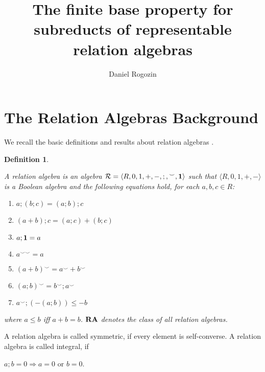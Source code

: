 \documentclass[a4paper]{article}
\author{Daniel Rogozin}
\date{}
\title{The finite base property for subreducts of representable relation algebras}
\theoremstyle{defin}
\newtheorem{defin}{Definition}
\theoremstyle{theorem}
\theoremstyle{prop}
\theoremstyle{lemma}
\theoremstyle{ex}
\theoremstyle{col}
\theoremstyle{claim}
\begin{document}
\maketitle

\section{The Relation Algebras Background}

We recall the basic definitions and results about relation algebras \cite{hirsch2002relation} \cite{maddux2006relation}.

\begin{defin}
  $ $

    A relation algebra is an algebra $\mathcal{R} = \langle R, 0, 1, +, -, ;, {}^{\smile}, {\bf 1 }\rangle$ such that $\langle R, 0, 1, +, - \rangle$ is a Boolean algebra and the following
    equations hold, for each $a, b, c \in R$:
    \begin{enumerate}
      \item $a ; (b ; c) = (a ; b) ; c$
      \item $(a + b) ; c = (a ; c) + (b ; c)$
      \item $a ; {\bf 1} = a$
      \item $a^{\smile \smile} = a$
      \item $(a + b)^{\smile} = a^{\smile} + b^{\smile}$
      \item $(a ; b)^{\smile} = b^{\smile} ; a^{\smile}$
      \item $a^{\smile} ; (- (a ; b)) \leq - b$
    \end{enumerate}
    where $a \leq b$ iff $a + b = b$. ${\bf RA}$ denotes the class of all relation
    algebras.
\end{defin}
A relation algebra is called symmetric, if every element is self-converse. A relation algebra is called integral, if
\begin{center}
  $a ; b = 0 \Rightarrow a = 0 \text{ or } b = 0$.
\end{center}
\end{document}
